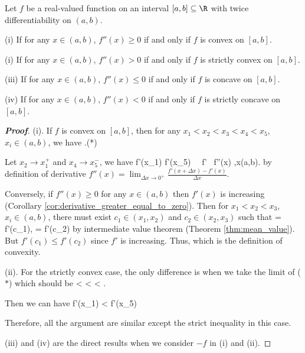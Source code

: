 


\begin{theorem}\label{thm:second_order_derivative_implis_convex_concave_strictly}
Let $f$ be a real-valued function on an interval $[a,b]\subseteq \R$ with twice differentiability on $(a,b)$.
\ben
\item [(i)] If for any $x\in (a,b)$, $f''(x) \geq 0$ if and only if $f$ is convex on $[a,b]$.
\item [(i)] If for any $x\in (a,b)$, $f''(x) > 0$ if and only if $f$ is strictly convex on $[a,b]$.
\item [(iii)] If for any $x\in (a,b)$, $f''(x) \leq 0$ if and only if $f$ is concave on $[a,b]$.
\item [(iv)] If for any $x\in (a,b)$, $f''(x) < 0$ if and only if $f$ is strictly concave on $[a,b]$.
\een
\end{theorem}

\begin{proof}[\bf Proof]
(i). If $f$ is convex on $[a,b]$, then for any $x_1<x_2<x_3<x_4<x_5$, $x_i\in (a,b)$, we have
\be
{} \leq {} \leq {} \leq {}.\qquad (*)
\ee

Let $x_2 \to x_1^+$ and $x_4 \to x_5^-$, we have
\be
f'(x_1) \leq f'(x_5) \ \ra\ f' \ \ra f''(x) ,\forall x\in (a,b).
\ee
by definition of derivative $f''(x) = \lim_{\Delta x\to 0^+} \frac{f'(x+\Delta x)-f'(x)}{\Delta x}$.

Conversely, if $f''(x)\geq 0$ for any $x\in (a,b)$ then $f'(x)$ is increasing (Corollary \ref{cor:derivative_greater_equal_to_zero}). Then for $x_1<x_2<x_3$, $x_i\in (a,b)$, there must exist $c_1\in (x_1,x_2)$ and $c_2 \in (x_2,x_3)$ such that  %
\be
{} = f'(c_1),\qquad {} = f'(c_2)
\ee
by intermediate value theorem (Theorem \ref{thm:mean_value}). But $f'(c_1) \leq f'(c_2)$ since $f'$ is increasing. Thus,
\be
{} \leq  {}
\ee
which is the definition of convexity.

(ii). For the strictly convex case, the only difference is when we take the limit of ($*$) which should be
\be
{} <  <  < .
\ee

Then we can have
\be
f'(x_1) \leq {} <  \leq f'(x_5)
\ee

Therefore, all the argument are similar except the strict inequality in this case.

(iii) and (iv) are the direct results when we consider $-f$ in (i) and (ii).
\end{proof}

